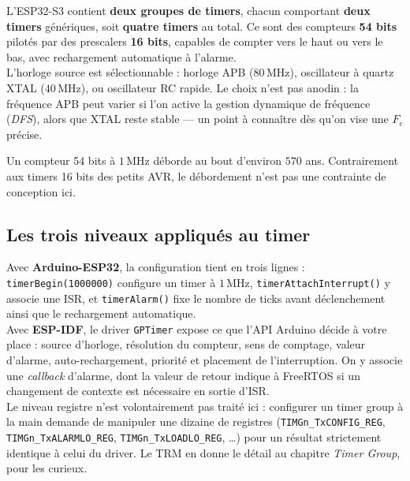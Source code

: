 L'ESP32-S3 contient \textbf{deux groupes de timers}, chacun comportant \textbf{deux timers} génériques, soit \textbf{quatre timers} au total. Ce sont des compteurs \textbf{54 bits} pilotés par des prescalers \textbf{16 bits}, capables de compter vers le haut ou vers le bas, avec rechargement automatique à l'alarme.\\

L'horloge source est sélectionnable : horloge APB ($80\,\mathrm{MHz}$), oscillateur à quartz XTAL ($40\,\mathrm{MHz}$), ou oscillateur RC rapide. Le choix n'est pas anodin : la fréquence APB peut varier si l'on active la gestion dynamique de fréquence (\textit{DFS}), alors que XTAL reste stable — un point à connaître dès qu'on vise une $F_e$ précise.

\begin{imp}
Un compteur 54 bits à $1\,\mathrm{MHz}$ déborde au bout d'environ $570$ ans. Contrairement aux timers 16 bits des petits AVR, le débordement n'est pas une contrainte de conception ici.
\end{imp}

\subsection{Les trois niveaux appliqués au timer}

Avec \textbf{Arduino-ESP32}, la configuration tient en trois lignes : \texttt{timerBegin(1000000)} configure un timer à $1\,\mathrm{MHz}$, \texttt{timerAttachInterrupt()} y associe une ISR, et \texttt{timerAlarm()} fixe le nombre de ticks avant déclenchement ainsi que le rechargement automatique. \cite{arduino_timer}\\

Avec \textbf{ESP-IDF}, le driver \texttt{GPTimer} expose ce que l'API Arduino décide à votre place : source d'horloge, résolution du compteur, sens de comptage, valeur d'alarme, auto-rechargement, priorité et placement de l'interruption. On y associe une \textit{callback} d'alarme, dont la valeur de retour indique à FreeRTOS si un changement de contexte est nécessaire en sortie d'ISR. \cite{esp32s3_gptimer}\\

Le niveau registre n'est volontairement pas traité ici : configurer un timer group à la main demande de manipuler une dizaine de registres (\texttt{TIMGn\_TxCONFIG\_REG}, \texttt{TIMGn\_TxALARMLO\_REG}, \texttt{TIMGn\_TxLOADLO\_REG}, \dots) pour un résultat strictement identique à celui du driver. Le TRM en donne le détail au chapitre \textit{Timer Group}, pour les curieux.

